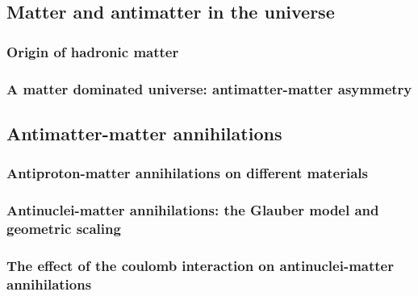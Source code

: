 \subsection{Matter and antimatter in the universe}

\subsubsection{Origin of hadronic matter}

\subsubsection{A matter dominated universe: antimatter-matter asymmetry}

\subsection{Antimatter-matter annihilations}
    
\subsubsection{Antiproton-matter annihilations on different materials}
\subsubsection{Antinuclei-matter annihilations: the Glauber model and geometric scaling}\label{sec:IntroGlauber}
\subsubsection{The effect of the coulomb interaction on antinuclei-matter annihilations}
